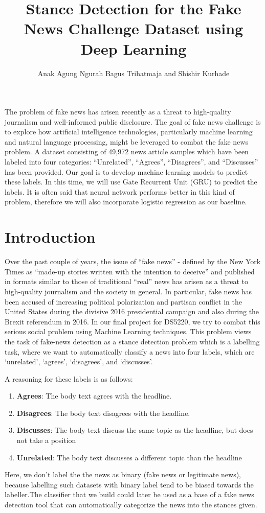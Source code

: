 \documentclass[12pt]{article}
\title{Stance Detection for the Fake News Challenge Dataset using Deep Learning}
\author{Anak Agung Ngurah Bagus Trihatmaja and Shishir Kurhade}
\date{}
\begin{document}
\maketitle

\abstract
The problem of fake news has arisen recently as a threat to high-quality 
journalism and well-informed public disclosure. 
The goal of fake news challenge is to explore how artificial intelligence 
technologies, particularly machine learning and 
natural language processing, might be leveraged to combat the fake news problem.
A dataset consisting of 49,972 news article samples which have been labeled 
into four categories: 
“Unrelated”, “Agrees”, “Disagrees”, and “Discusses” has been provided.
Our goal is to develop machine learning models to predict these labels. 
In this time, we will use Gate Recurrent Unit (GRU) to predict the labels.
It is often said that neural network performs better in this kind of problem,
therefore we will also incorporate logistic regression as our baseline.


\section{Introduction}
Over the past couple of years, the issue of “fake news” \-- defined by the 
New York Times as “made-up stories written with the intention to deceive” and 
published in formats similar to those of traditional “real” news has arisen as 
a threat to high-quality journalism and the society in general. 
In particular, fake news has been accused of increasing political polarization 
and partisan conflict in the United States during the divisive 2016 
presidential campaign and also during the Brexit referendum in 2016.
In our final project for DS5220, we try to combat this serious social problem 
using Machine Learning techniques. This problem views the task of fake-news 
detection as a stance detection problem which is a labelling task, 
where we want to automatically classify a news into four labels, 
which are ‘unrelated’, ‘agrees’, ‘disagrees’, and ‘discusses’.  

A reasoning for these labels is as follows:
\begin{enumerate}
  \item \textbf{Agrees}: The body text agrees with the headline.
  \item \textbf{Disagrees}: The body text disagrees with the headline.
  \item \textbf{Discusses}: The body text discuss the same topic as the headline, 
    but does not take a position
  \item \textbf{Unrelated}: The body text discusses a different topic than the headline
\end{enumerate}
Here, we don’t label the the news as binary (fake news or legitimate news),
because labelling such datasets with binary label tend to be biased towards 
the labeller.The classifier that we build could later be used as a base of a 
fake news detection tool that can automatically categorize the news into the 
stances given.
\end{document}
